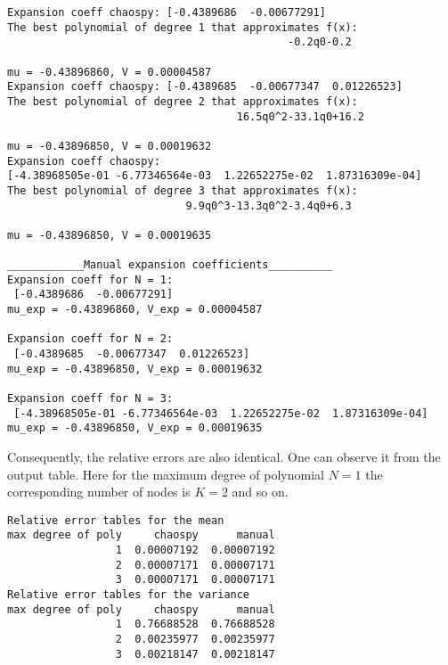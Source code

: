 \documentclass[11pt]{article}
\begin{document}
\begin{lstlisting}
Expansion coeff chaospy: [-0.4389686  -0.00677291]
The best polynomial of degree 1 that approximates f(x):
                                            -0.2q0-0.2

mu = -0.43896860, V = 0.00004587
Expansion coeff chaospy: [-0.4389685  -0.00677347  0.01226523]
The best polynomial of degree 2 that approximates f(x):
                                    16.5q0^2-33.1q0+16.2

mu = -0.43896850, V = 0.00019632
Expansion coeff chaospy: 
[-4.38968505e-01 -6.77346564e-03  1.22652275e-02  1.87316309e-04]
The best polynomial of degree 3 that approximates f(x):
                            9.9q0^3-13.3q0^2-3.4q0+6.3

mu = -0.43896850, V = 0.00019635

____________Manual expansion coefficients__________
Expansion coeff for N = 1:
 [-0.4389686  -0.00677291]
mu_exp = -0.43896860, V_exp = 0.00004587

Expansion coeff for N = 2:
 [-0.4389685  -0.00677347  0.01226523]
mu_exp = -0.43896850, V_exp = 0.00019632

Expansion coeff for N = 3:
 [-4.38968505e-01 -6.77346564e-03  1.22652275e-02  1.87316309e-04]
mu_exp = -0.43896850, V_exp = 0.00019635
\end{lstlisting}
\newpage
Consequently, the relative errors are also identical. One can observe it from the output table.
Here for the maximum degree of polynomial $N = 1$ the corresponding number of nodes is $K = 2$ and so on.
\begin{lstlisting}
Relative error tables for the mean
max degree of poly     chaospy      manual
                 1  0.00007192  0.00007192
                 2  0.00007171  0.00007171
                 3  0.00007171  0.00007171
Relative error tables for the variance
max degree of poly     chaospy      manual
                 1  0.76688528  0.76688528
                 2  0.00235977  0.00235977
                 3  0.00218147  0.00218147
\end{lstlisting}
\end{document}
